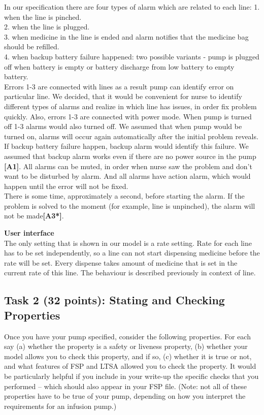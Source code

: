 \documentclass{article}
\newcommand{\head}{\subsection*}
\begin{document}
In our specification there are four types of alarm which are related to each line: 
1. when the line is pinched.\\
2. when the line is plugged.\\
3. when medicine in the line is ended and alarm notifies that the medicine bag should be refilled.\\
4. when backup battery failure happened: two possible variants - pump is plugged off when battery is empty or battery discharge from low battery to empty battery.\\
 Errors 1-3 are connected with lines as a result pump can identify error on particular line. We decided, that it would be convenient for nurse to identify different types of alarms and realize in which line has issues, in order fix problem quickly. Also, errors 1-3 are connected with power mode. When pump is turned off 1-3 alarms would also turned off. We assumed that when pump would be turned on, alarms will occur again automatically after the initial problem reveals. If backup battery failure happen, backup alarm would identify this failure. We assumed that backup alarm works even if there are no power source in the pump \textbf{[A1]}.
All alarms can be muted, in order when nurse saw the problem and don't want to be disturbed by alarm. And all alarms have action alarm, which would happen until the error will not be fixed.\\
There is some time, approximately a second, before starting the alarm. If the problem is solved to the moment (for example, line is unpinched), the alarm will not be made\textbf{[A3*]}.

\textbf{User interface} \\

The only setting that is shown in our model is a rate setting. Rate for each line has to be set independently, so a line can not start dispensing medicine before the rate will be set. Every dispense takes amount of medicine that is set in the current rate of this line. The behaviour is described previously in context of line.




\head{Task 2 (32 points): Stating and Checking Properties}

Once you have your pump specified, consider the following properties. For each say (a) whether the property
is a safety or liveness property,  (b) whether your model allows you to check this property, and if
so, (c) whether it is true or not, and what features of FSP and LTSA allowed you to check the
property. It would be particularly helpful if you include in your write-up the specific checks that you performed -- which should also appear in your FSP file. (Note: not all of these properties have to be true of your pump, depending on how you interpret the requirements for an infusion pump.)
\end{document}
